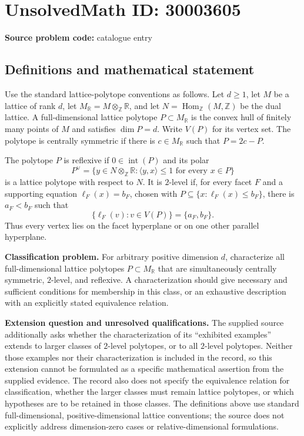 \documentclass[11pt]{article}
\newcommand{\Z}{\mathbb{Z}}
\newcommand{\R}{\mathbb{R}}
\begin{document}
\section*{UnsolvedMath ID: 30003605}
\textbf{Source problem code:} catalogue entry
\subsection{Definitions and mathematical statement}
Use the standard lattice-polytope conventions as follows. Let \(d\geq 1\), let \(M\) be a lattice of rank \(d\), let \(M_{\R}=M\otimes_{\Z}\R\), and let \(N=\operatorname{Hom}_{\Z}(M,\Z)\) be the dual lattice. A full-dimensional lattice polytope \(P\subset M_{\R}\) is the convex hull of finitely many points of \(M\) and satisfies \(\dim P=d\). Write \(V(P)\) for its vertex set. The polytope is centrally symmetric if there is \(c\in M_{\R}\) such that \(P=2c-P\).

The polytope \(P\) is reflexive if \(0\in\operatorname{int}(P)\) and its polar
\[
P^{\vee}=\{y\in N\otimes_{\Z}\R:\langle y,x\rangle\leq 1\text{ for every }x\in P\}
\]
is a lattice polytope with respect to \(N\). It is \(2\)-level if, for every facet \(F\) and a supporting equation \(\ell_F(x)=b_F\), chosen with \(P\subseteq\{x:\ell_F(x)\leq b_F\}\), there is \(a_F<b_F\) such that
\[
\{\ell_F(v):v\in V(P)\}=\{a_F,b_F\}.
\]
Thus every vertex lies on the facet hyperplane or on one other parallel hyperplane.

\textbf{Classification problem.} For arbitrary positive dimension \(d\), characterize all full-dimensional lattice polytopes \(P\subset M_{\R}\) that are simultaneously centrally symmetric, \(2\)-level, and reflexive. A characterization should give necessary and sufficient conditions for membership in this class, or an exhaustive description with an explicitly stated equivalence relation.

\textbf{Extension question and unresolved qualifications.} The supplied source additionally asks whether the characterization of its ``exhibited examples'' extends to larger classes of \(2\)-level polytopes, or to all \(2\)-level polytopes. Neither those examples nor their characterization is included in the record, so this extension cannot be formulated as a specific mathematical assertion from the supplied evidence. The record also does not specify the equivalence relation for classification, whether the larger classes must remain lattice polytopes, or which hypotheses are to be retained in those classes. The definitions above use standard full-dimensional, positive-dimensional lattice conventions; the source does not explicitly address dimension-zero cases or relative-dimensional formulations.
\end{document}
